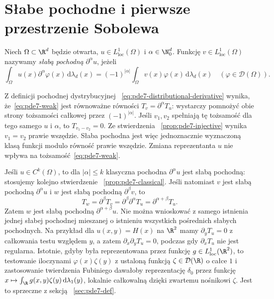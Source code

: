 \section{Słabe pochodne i pierwsze przestrzenie Sobolewa}
\label{sec:pde7-weak}

\begin{definicja}
\label{def:pde7-weak}
Niech $\Omega\subset\R^d$ będzie otwarta,
$u\in L^1_{\mathrm{loc}}(\Omega)$ i $\alpha\in\N_0^d$.
Funkcję $v\in L^1_{\mathrm{loc}}(\Omega)$ nazywamy
\emph{słabą pochodną} $\partial^\alpha u$, jeżeli
\begin{equation}\label{eq:pde7-weak}
 \int_\Omega u(x)\partial^\alpha\varphi(x)\,\mathrm d\lambda_d(x)
 =(-1)^{|\alpha|}\int_\Omega v(x)\varphi(x)\,
 \mathrm d\lambda_d(x)
 \quad (\varphi\in\mathcal D(\Omega)).
\end{equation}
\end{definicja}

Z definicji pochodnej dystrybucyjnej
~\eqref{eq:pde7-distributional-derivative}
wynika, że~\eqref{eq:pde7-weak} jest równoważne
równości $T_v=\partial^\alpha T_u$:
wystarczy pomnożyć obie strony tożsamości całkowej
przez $(-1)^{|\alpha|}$.
Jeśli $v_1,v_2$ spełniają tę tożsamość dla tego samego
$u$ i $\alpha$, to $T_{v_1-v_2}=0$. Ze stwierdzenia
~\ref{prop:pde7-injective} wynika
$v_1=v_2$ prawie wszędzie. Słaba pochodna jest więc
jednoznacznie wyznaczoną klasą funkcji modulo równość
prawie wszędzie. Zmiana reprezentanta $u$ nie wpływa
na tożsamość~\eqref{eq:pde7-weak}.

Jeśli $u\in C^k(\Omega)$, to dla $|\alpha|\le k$
klasyczna pochodna $\partial^\alpha u$ jest słabą
pochodną: stosujemy kolejno stwierdzenie
~\ref{prop:pde7-classical}.
Jeśli natomiast $v$ jest słabą pochodną $\partial^\alpha u$
i $w$ jest słabą pochodną $\partial^\beta v$, to
\[
 T_w=\partial^\beta T_v
 =\partial^\beta\partial^\alpha T_u
 =\partial^{\alpha+\beta}T_u.
\]
Zatem $w$ jest słabą pochodną $\partial^{\alpha+\beta}u$.
Nie można wnioskować z samego istnienia jednej
słabej pochodnej mieszanej o istnieniu wszystkich
pośrednich słabych pochodnych. Na przykład
dla $u(x,y)=H(x)$ na $\R^2$ mamy
$\partial_yT_u=0$ z całkowania testu względem $y$,
a zatem $\partial_x\partial_yT_u=0$,
podczas gdy $\partial_xT_u$ nie jest regularna.
Istotnie, gdyby była reprezentowana przez
funkcję $g\in L^1_{\mathrm{loc}}(\R^2)$,
to testowanie iloczynami $\varphi(x)\zeta(y)$
z ustaloną funkcją $\zeta\in\mathcal D(\R)$
o całce $1$ i zastosowanie twierdzenia Fubiniego
dawałoby reprezentację $\delta_0$ przez funkcję
$x\mapsto\int_\R g(x,y)\zeta(y)\,\mathrm d\lambda_1(y)$,
lokalnie całkowalną dzięki zwartemu nośnikowi
$\zeta$. Jest to sprzeczne z sekcją
~\ref{sec:pde7-def}.

